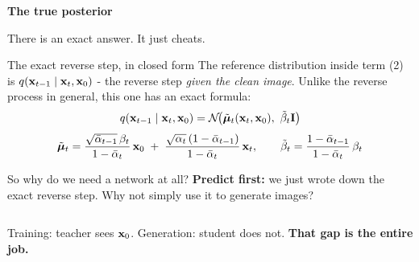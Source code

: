 \documentclass[aspectratio=169]{beamer}
\begin{document}
\begin{frame}[plain]
  \vfill
  \begin{center}
    {\Large\color{popblue}\textbf{The true posterior}}\\[0.9em]
    \begin{minipage}{0.82\textwidth}\centering\small
      There is an exact answer. It just cheats.
    \end{minipage}
  \end{center}
  \vfill
\end{frame}

\begin{frame}{The exact reverse step, in closed form}
  \small
  The reference distribution inside term (2) is
  $q(\mathbf{x}_{t-1}\mid \mathbf{x}_t, \mathbf{x}_0)$ - the reverse step \emph{given the clean image}. Unlike
  the reverse process in general, this one has an exact formula:
  \[
    q(\mathbf{x}_{t-1}\mid \mathbf{x}_t, \mathbf{x}_0) = \mathcal{N}\!\big(\tilde{\bm\mu}_t(\mathbf{x}_t,\mathbf{x}_0),\ \tilde\beta_t \mathbf{I}\big)
  \]
  \vskip -2pt
  \[
    \tilde{\bm\mu}_t = \frac{\sqrt{\bar\alpha_{t-1}}\,\beta_t}{1-\bar\alpha_t}\,\mathbf{x}_0
      \;+\; \frac{\sqrt{\alpha_t}\,(1-\bar\alpha_{t-1})}{1-\bar\alpha_t}\,\mathbf{x}_t,
    \qquad
    \tilde\beta_t = \frac{1-\bar\alpha_{t-1}}{1-\bar\alpha_t}\,\beta_t
  \]
  \vskip 4pt
\end{frame}

\begin{frame}{So why do we need a network at all?}
  \small
  \textbf{Predict first:} we just wrote down the exact reverse step. Why not simply use it
  to generate images?
  \vskip 5pt
  \pause
  \begin{columns}[T]
  \end{columns}
  \vskip 8pt
  \begin{center}\small
    Training: teacher sees $\mathbf{x}_0$. \quad Generation: student does not. \quad
    \textcolor{paramgreen}{\textbf{That gap is the entire job.}}
  \end{center}
\end{frame}
\end{document}
